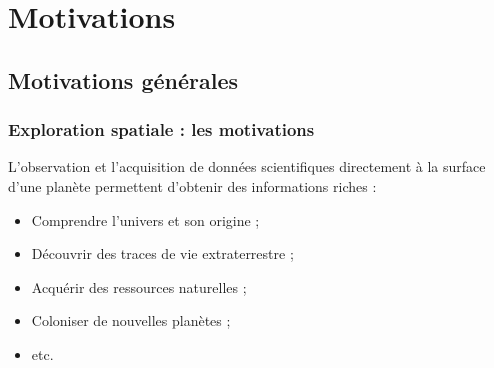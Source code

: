 \section{Motivations}
    
\subsection{Motivations générales}    
    \begin{frame}
        \frametitle{Exploration spatiale : les motivations}
        L'observation et l'acquisition de données scientifiques directement à la surface d'une planète permettent d'obtenir des informations riches :
        \begin{itemize}
            \item Comprendre l'univers et son origine \cite{motivation1} ;
            \item Découvrir des traces de vie extraterrestre \cite{motivation2} ;
            \item Acquérir des ressources naturelles \cite{motivation2} ;
            \item Coloniser de nouvelles planètes \cite{motivation1} ;
            \item etc.
        \end{itemize}
    \end{frame}
    
